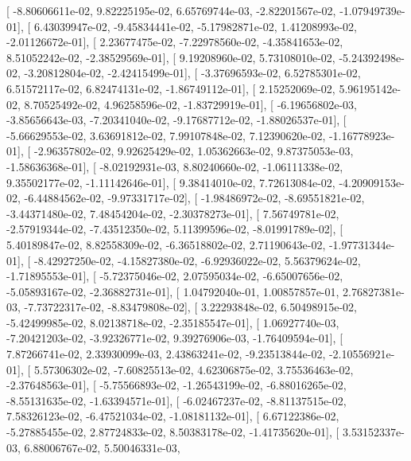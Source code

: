 \documentclass{article}
\begin{document}
       [ -8.80606611e-02,   9.82225195e-02,   6.65769744e-03,
         -2.82201567e-02,  -1.07949739e-01],
       [  6.43039947e-02,  -9.45834441e-02,  -5.17982871e-02,
          1.41208993e-02,  -2.01126672e-01],
       [  2.23677475e-02,  -7.22978560e-02,  -4.35841653e-02,
          8.51052242e-02,  -2.38529569e-01],
       [  9.19208960e-02,   5.73108010e-02,  -5.24392498e-02,
         -3.20812804e-02,  -2.42415499e-01],
       [ -3.37696593e-02,   6.52785301e-02,   6.51572117e-02,
          6.82474131e-02,  -1.86749112e-01],
       [  2.15252069e-02,   5.96195142e-02,   8.70525492e-02,
          4.96258596e-02,  -1.83729919e-01],
       [ -6.19656802e-03,  -3.85656643e-03,  -7.20341040e-02,
         -9.17687712e-02,  -1.88026537e-01],
       [ -5.66629553e-02,   3.63691812e-02,   7.99107848e-02,
          7.12390620e-02,  -1.16778923e-01],
       [ -2.96357802e-02,   9.92625429e-02,   1.05362663e-02,
          9.87375053e-03,  -1.58636368e-01],
       [ -8.02192931e-03,   8.80240660e-02,  -1.06111338e-02,
          9.35502177e-02,  -1.11142646e-01],
       [  9.38414010e-02,   7.72613084e-02,  -4.20909153e-02,
         -6.44884562e-02,  -9.97331717e-02],
       [ -1.98486972e-02,  -8.69551821e-02,  -3.44371480e-02,
          7.48454204e-02,  -2.30378273e-01],
       [  7.56749781e-02,  -2.57919344e-02,  -7.43512350e-02,
          5.11399596e-02,  -8.01991789e-02],
       [  5.40189847e-02,   8.82558309e-02,  -6.36518802e-02,
          2.71190643e-02,  -1.97731344e-01],
       [ -8.42927250e-02,  -4.15827380e-02,  -6.92936022e-02,
          5.56379624e-02,  -1.71895553e-01],
       [ -5.72375046e-02,   2.07595034e-02,  -6.65007656e-02,
         -5.05893167e-02,  -2.36882731e-01],
       [  1.04792040e-01,   1.00857857e-01,   2.76827381e-03,
         -7.73722317e-02,  -8.83479808e-02],
       [  3.22293848e-02,   6.50498915e-02,  -5.42499985e-02,
          8.02138718e-02,  -2.35185547e-01],
       [  1.06927740e-03,  -7.20421203e-02,  -3.92326771e-02,
          9.39276906e-03,  -1.76409594e-01],
       [  7.87266741e-02,   2.33930099e-03,   2.43863241e-02,
         -9.23513844e-02,  -2.10556921e-01],
       [  5.57306302e-02,  -7.60825513e-02,   4.62306875e-02,
          3.75536463e-02,  -2.37648563e-01],
       [ -5.75566893e-02,  -1.26543199e-02,  -6.88016265e-02,
         -8.55131635e-02,  -1.63394571e-01],
       [ -6.02467237e-02,  -8.81137515e-02,   7.58326123e-02,
         -6.47521034e-02,  -1.08181132e-01],
       [  6.67122386e-02,  -5.27885455e-02,   2.87724833e-02,
          8.50383178e-02,  -1.41735620e-01],
       [  3.53152337e-03,   6.88006767e-02,   5.50046331e-03,
\end{document}
